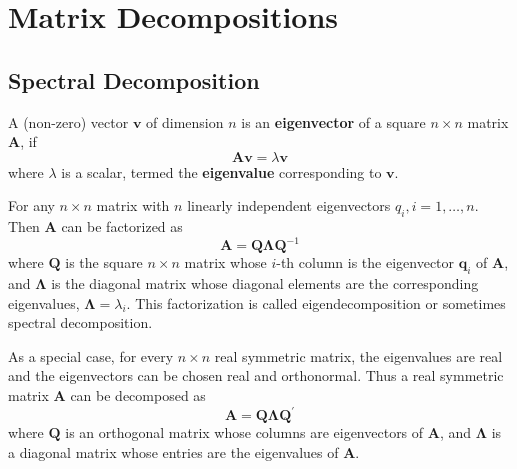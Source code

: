 \chapter{Matrix Decompositions}
\label{chapter:matrix-decompositions}

\section{Spectral Decomposition}

\begin{definition}
    A (non-zero) vector $\mathbf{v}$ of dimension $n$ is an \textbf{eigenvector} of a square $n\times n$ matrix $\mathbf{A}$, if
    \begin{equation}
        \mathbf{A}\mathbf{v}=\lambda\mathbf{v}
    \end{equation}
    where $\lambda$ is a scalar, termed the \textbf{eigenvalue} corresponding to $\mathbf{v}$.
\end{definition}

\begin{definition}
    For any $n\times n$ matrix with $n$ linearly independent eigenvectors $q_{i},i=1,\ldots,n$. Then $\mathbf{A}$ can be factorized as
    \begin{equation*}
        \mathbf{A}=\mathbf{Q}\boldsymbol{\Lambda}\mathbf{Q}^{-1}
    \end{equation*}
    where $\mathbf{Q}$ is the square $n\times n$ matrix whose $i$-th column is the eigenvector $\mathbf{q}_{i}$ of $\mathbf{A}$, and $\boldsymbol{\Lambda}$ is the diagonal matrix whose diagonal elements are the corresponding eigenvalues, $\boldsymbol{\Lambda}=\lambda_{i}$. This factorization is called eigendecomposition or sometimes spectral decomposition.
\end{definition}

\begin{example}
    As a special case, for every $n\times n$ real symmetric matrix, the eigenvalues are real and the eigenvectors can be chosen real and orthonormal. Thus a real symmetric matrix $\mathbf{A}$ can be decomposed as
    \begin{equation}
        \mathbf{A}=\mathbf{Q}\boldsymbol{\Lambda}\mathbf{Q}^{\prime}
    \end{equation}
    where $\mathbf{Q}$ is an orthogonal matrix whose columns are  eigenvectors of $\mathbf{A}$, and $\boldsymbol{\Lambda}$ is a diagonal matrix whose entries are the eigenvalues of $\mathbf{A}$.
\end{example}

